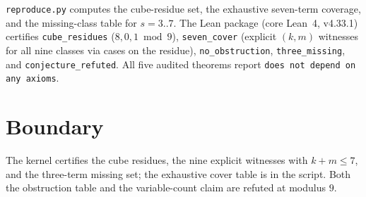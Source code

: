 \documentclass[11pt]{article}
\begin{document}
\texttt{reproduce.py} computes the cube-residue set, the exhaustive
seven-term coverage, and the missing-class table for
$s = 3..7$.  The Lean package (core Lean~4, v4.33.1) certifies
\texttt{cube\_residues} ($8, 0, 1 \bmod 9$), \texttt{seven\_cover}
(explicit $(k, m)$ witnesses for all nine classes via cases on the
residue), \texttt{no\_obstruction}, \texttt{three\_missing}, and
\texttt{conjecture\_refuted}.  All five audited theorems report
\texttt{does not depend on any axioms}.

\section{Boundary}

The kernel certifies the cube residues, the nine explicit
witnesses with $k + m \le 7$, and the three-term missing set; the
exhaustive cover table is in the script.  Both the obstruction
table and the variable-count claim are refuted at modulus $9$.
\end{document}
